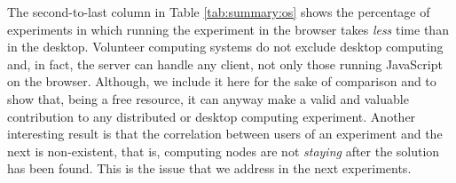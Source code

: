 \documentclass{sig-alternate}
\begin{document}
The second-to-last column in Table \ref{tab:summary:os} shows the percentage of experiments in which running the
experiment in the browser takes {\em less} time than in the
desktop. Volunteer computing systems do not exclude desktop
computing and, in fact, the server can handle any client, not only
those running JavaScript on the browser. Although, we include it here for the
sake of comparison and to show that, being a free resource, it can
anyway make a valid and valuable contribution to any distributed or
desktop computing experiment. Another interesting result is that the
correlation between users of an experiment and the next is
non-existent, that is, computing nodes are not {\em
  staying} after the solution has been found. This is the issue that we
address in the next experiments. 
\end{document}
